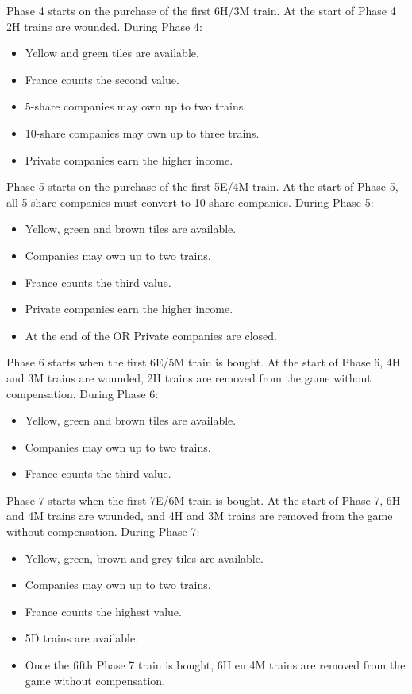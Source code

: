 \documentclass[a4paper,twocolumn]{article}
\begin{document}
Phase 4 starts on the purchase of the first 6H/3M train. At the start of Phase 4
2H trains are wounded. During Phase 4:
\begin{itemize}
	\item Yellow and green tiles are available.
	\item France counts the second value.
	\item 5-share companies may own up to two trains.
	\item 10-share companies may own up to three trains.
	\item Private companies earn the higher income.
\end{itemize}

Phase 5 starts on the purchase of the first 5E/4M train. At the start of Phase
5, all 5-share companies must convert to 10-share companies. During Phase 5:
\begin{itemize}
	\item Yellow, green and brown tiles are available.
	\item Companies may own up to two trains.
	\item France counts the third value.
	\item Private companies earn the higher income.
	\item At the end of the OR Private companies are closed.
\end{itemize}

Phase 6 starts when the first 6E/5M train is bought. At the start of Phase 6, 4H
and 3M trains are wounded, 2H trains are removed from the game without
compensation. During Phase 6:
\begin{itemize}
	\item Yellow, green and brown tiles are available.
	\item Companies may own up to two trains.
	\item France counts the third value.
\end{itemize}

Phase 7 starts when the first 7E/6M train is bought. At the start of Phase 7, 6H
and 4M trains are wounded, and 4H and 3M trains are removed from the game
without compensation. During Phase 7:
\begin{itemize}
	\item Yellow, green, brown and grey tiles are available.
	\item Companies may own up to two trains.
	\item France counts the highest value.
	\item 5D trains are available.
	\item Once the fifth Phase 7 train is bought, 6H en 4M trains are removed
	from the game without compensation.
\end{itemize}
\end{document}
